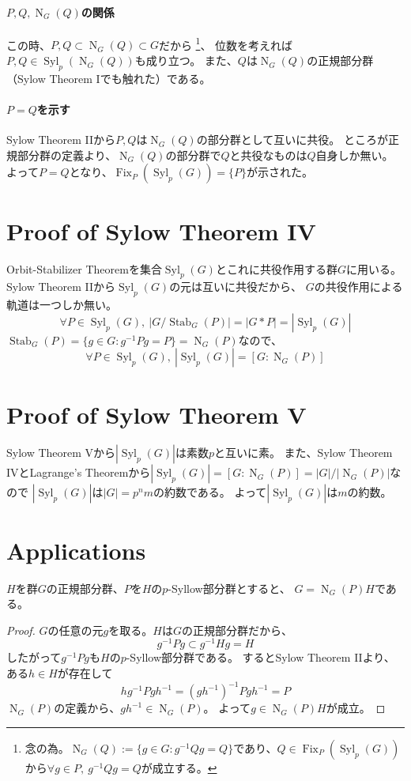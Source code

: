 \documentclass[a4paper]{jsarticle}
\newcommand{\Stab}{\operatorname{Stab}}
\newcommand{\Fix}{\operatorname{Fix}}
\newcommand{\Norm}{\operatorname{N}}
\newcommand{\Syl}{\operatorname{Syl}}
\begin{document}
    \paragraph{$P, Q, \Norm_G(Q)$の関係}
    この時、$P,Q \subset \Norm_G(Q) \subset G$だから
    \footnote{念の為。$\Norm_G(Q):=\{ g \in G : g^{-1}Qg=Q \}$であり、$Q \in \Fix_P(\Syl_p(G))$から$\forall g \in P,~ g^{-1}Qg=Q$が成立する。}、
    位数を考えれば$P,Q \in \Syl_p(\Norm_G(Q))$も成り立つ。
    また、$Q$は$\Norm_G(Q)$の正規部分群（Sylow Theorem Iでも触れた）である。

    \paragraph{$P=Q$を示す}
    Sylow Theorem IIから$P,Q$は$\Norm_G(Q)$の部分群として互いに共役。
    ところが正規部分群の定義より、$\Norm_G(Q)$の部分群で$Q$と共役なものは$Q$自身しか無い。
    よって$P=Q$となり、$\Fix_P(\Syl_p(G))=\{ P \}$が示された。
    

    \section{Proof of Sylow Theorem IV}
    Orbit-Stabilizer Theoremを集合$\Syl_p(G)$とこれに共役作用する群$G$に用いる。
    Sylow Theorem IIから$\Syl_p(G)$の元は互いに共役だから、
    $G$の共役作用による軌道は一つしか無い。
    \[ \forall P \in \Syl_p(G),~ |G/\Stab_G(P)|=|G \ast P|=|\Syl_p(G)|\]
    $\Stab_G(P)=\{ g \in G : g^{-1}Pg=P \}=\Norm_G(P)$なので、
    \[ \forall P \in \Syl_p(G),~ |\Syl_p(G)|=[G:\Norm_G(P)] \]
    

    \section{Proof of Sylow Theorem V}
    Sylow Theorem Vから$|\Syl_p(G)|$は素数$p$と互いに素。
    また、Sylow Theorem IVとLagrange's Theoremから$|\Syl_p(G)|=[G:\Norm_G(P)]=|G|/|\Norm_G(P)|$なので
    $|\Syl_p(G)|$は$|G|=p^n m$の約数である。
    よって$|\Syl_p(G)|$は$m$の約数。
    

    \section{Applications}
    \begin{Lemma}
        $H$を群$G$の正規部分群、$P$を$H$の$p$-Syllow部分群とすると、
        $G=\Norm_G(P)H$である。
    \end{Lemma}
    \begin{proof}
        $G$の任意の元$g$を取る。$H$は$G$の正規部分群だから、
        \[ g^{-1}Pg \subset g^{-1}Hg=H \]
        したがって$g^{-1}Pg$も$H$の$p$-Syllow部分群である。
        するとSylow Theorem IIより、ある$h \in H$が存在して
        \[ hg^{-1} P gh^{-1} = (gh^{-1})^{-1} P gh^{-1} = P \]
        $\Norm_G(P)$の定義から、$gh^{-1} \in \Norm_G(P)$。
        よって$g \in \Norm_G(P)H$が成立。
        
    \end{proof}
\end{document}
